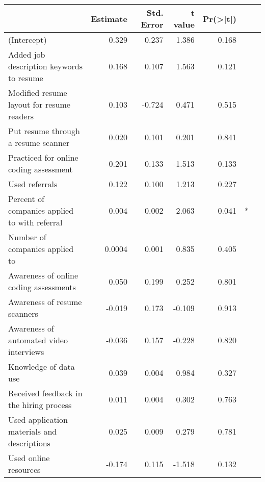 \begin{table}[ht]
\begin{tabular}{lrrrrrl}
\toprule
& \textbf{Estimate}  & \textbf{Std. Error} & \textbf{t value} & \textbf{Pr(\textgreater{}|t|)} &   \\
\hline
(Intercept)                                          & 0.329     & 0.237      & 1.386   & 0.168                &   \\
Added job description keywords to resume    & 0.168     & 0.107      & 1.563   & 0.121                 &   \\
Modified resume layout for resume readers & 0.103     & -0.724     & 0.471   & 0.515                 &   \\
Put resume through a resume scanner                  & 0.020     & 0.101      & 0.201   & 0.841                 &   \\
Practiced for online coding assessment               & -0.201    & 0.133      & -1.513  & 0.133                 &   \\
Used referrals                                       & 0.122     & 0.100      & 1.213   & 0.227                 &   \\
Percent of companies applied to with referral   & 0.004     & 0.002      & 2.063   & 0.041                 & * \\
Number of companies applied to                       & 0.0004    & 0.001     & 0.835   & 0.405                 &   \\
Awareness of online coding assessments               & 0.050     & 0.199      & 0.252   & 0.801                 &   \\
Awareness of resume scanners                         & -0.019    & 0.173      & -0.109  & 0.913                 &   \\
Awareness of automated video interviews              & -0.036    & 0.157      & -0.228  & 0.820                 &   \\
Knowledge of data use                                & 0.039     & 0.004      & 0.984   & 0.327                 &   \\
Received feedback in the hiring process              & 0.011     & 0.004      & 0.302   & 0.763                 &   \\
Used application materials and descriptions          & 0.025     & 0.009      & 0.279   & 0.781                 &   \\
Used online resources                                & -0.174    & 0.115      & -1.518  & 0.132                 &   \\

\end{tabular}
\end{table}
